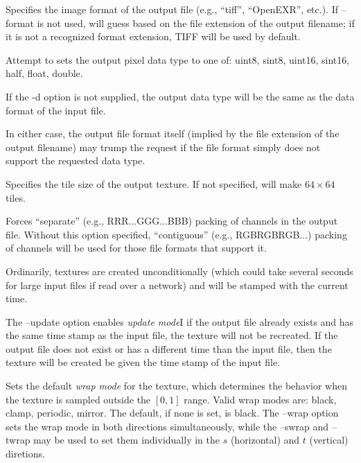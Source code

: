 Specifies the image format of the output file (e.g., ``tiff'',
``OpenEXR'', etc.).  If {\cf --format} is not used, \maketx will 
guess based on the file extension of the output filename; if it
is not a recognized format extension, TIFF will be used by default.
\apiend

Attempt to sets the output pixel data type to one of: {\cf uint8}, 
{\cf sint8}, {\cf uint16}, {\cf sint16}, {\cf half}, {\cf float}, 
{\cf double}.

If the {\cf -d} option is not supplied, the output data type will
be the same as the data format of the input file.

In either case, the output file format itself (implied by the file
extension of the output filename) may trump the request if the file
format simply does not support the requested data type.
\apiend

Specifies the tile size of the output texture.  If not specified,
\maketx will make $64 \times 64$ tiles.
\apiend

Forces ``separate'' (e.g., RRR...GGG...BBB) packing of channels in the
output file.  Without this option specified, ``contiguous'' (e.g.,
RGBRGBRGB...) packing of channels will be used for those file formats
that support it.
\apiend

Ordinarily, textures are created unconditionally (which could take
several seconds for large input files if read over a network) and will
be stamped with the current time.

The {\cf --update} option enables \emph{update mode}I if the output file
already exists and has the same time stamp as the input file, the
texture will not be recreated.  If the output file does not exist or has
a different time than the input file, then the texture will be created
be given the time stamp of the input file.
\apiend

Sets the default \emph{wrap mode} for the texture, which determines
the behavior when the texture is sampled outside the $[0,1]$ range.
Valid wrap modes are: {\cf black}, {\cf clamp}, {\cf periodic},
{\cf mirror}.  The default, if none is set, is {\cf black}.  The
{\cf --wrap} option sets the wrap mode in both directions
simultaneously, while the {\cf --swrap} and {\cf --twrap} may be used to
set them individually in the $s$ (horizontal) and $t$ (vertical)
diretions.

